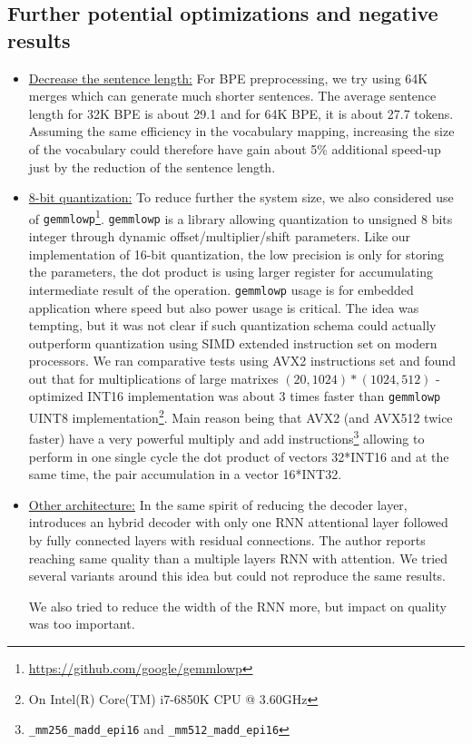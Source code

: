 \documentclass[11pt,a4paper]{article}
\begin{document}
\subsection{Further potential optimizations and negative results}
\begin{itemize}
\item \underline{Decrease the sentence length:}
For BPE preprocessing, we try using 64K merges which can generate much shorter sentences.
The average sentence length for 32K BPE is about 29.1 and for 64K BPE, it is about 27.7 tokens. Assuming the same efficiency in the vocabulary mapping, increasing the size of the vocabulary could therefore have gain about 5\% additional speed-up just by the reduction of the sentence length.

\item \underline{8-bit quantization:}
To reduce further the system size, we also considered use of {\tt gemmlowp}\footnote{\url{https://github.com/google/gemmlowp}}. {\tt gemmlowp} is a library allowing quantization to unsigned 8 bits integer through dynamic offset/multiplier/shift parameters. Like our implementation of 16-bit quantization, the low precision is only for storing the parameters, the dot product is using larger register for accumulating intermediate result of the operation. {\tt gemmlowp} usage is for embedded application where speed but also power usage is critical. The idea was tempting, but it was not clear if such quantization schema could actually outperform quantization using SIMD extended instruction set on modern processors. We ran  comparative tests using AVX2 instructions set and found out that for multiplications of large matrixes $(20,1024) * (1024,512)$ - optimized INT16 implementation was about 3 times faster than  {\tt gemmlowp} UINT8 implementation\footnote{On Intel(R) Core(TM) i7-6850K CPU @ 3.60GHz}. Main reason being that AVX2 (and AVX512 twice faster) have a very powerful multiply and add instructions\footnote{{\tt \_mm256\_madd\_epi16} and {\tt \_mm512\_madd\_epi16}} allowing to perform in one single cycle the dot product of vectors 32*INT16 and at the same time, the pair accumulation in a vector 16*INT32.

\item\underline{Other architecture:}
In the same spirit of reducing the decoder layer,  introduces an hybrid decoder with only one RNN attentional layer followed by fully connected layers with residual connections. The author reports reaching same quality than a multiple layers RNN with attention. We tried several variants around this idea but could not reproduce the same results.

We also tried to reduce the width of the RNN more, but impact on quality was too important.
\end{itemize}
\end{document}
